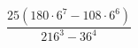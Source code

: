 \begin{ex}[type=calculate]
	\begin{condition}
		\( \dfrac{25(180\cdot6^7-108\cdot6^6)}{216^3-36^4} \)
	\end{condition}
\end{ex}